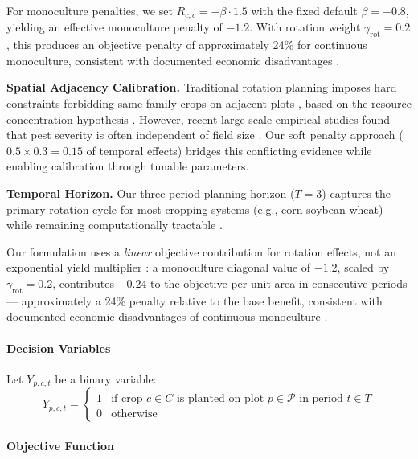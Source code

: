 \documentclass{oqireport}
\begin{document}
For monoculture penalties, we set $R_{c,c} = -\beta \cdot 1.5$ with the fixed default $\beta = -0.8$, yielding an effective monoculture penalty of $-1.2$. With rotation weight $\gamma_{\text{rot}} = 0.2$, this produces an objective penalty of approximately 24\% for continuous monoculture, consistent with documented economic disadvantages \cite{preissel2015magnitude, reckling2018grain}.

\textbf{Spatial Adjacency Calibration.}
Traditional rotation planning imposes hard constraints forbidding same-family crops on adjacent plots \cite{ballot2023first}, based on the resource concentration hypothesis \cite{root1973organization}. However, recent large-scale empirical studies found that pest severity is often independent of field size \cite{karp2018crop}. Our soft penalty approach ($0.5 \times 0.3 = 0.15$ of temporal effects) bridges this conflicting evidence while enabling calibration through tunable parameters.

\textbf{Temporal Horizon.}
Our three-period planning horizon ($T = 3$) captures the primary rotation cycle for most cropping systems (e.g., corn-soybean-wheat) while remaining computationally tractable \cite{haneveld2005crop}.

Our formulation uses a \emph{linear} objective contribution for rotation effects, not an exponential yield multiplier \cite{cai2011dynamic}: a monoculture diagonal value of $-1.2$, scaled by $\gamma_{\text{rot}}=0.2$, contributes $-0.24$ to the objective per unit area in consecutive periods — approximately a 24\% penalty relative to the base benefit, consistent with documented economic disadvantages of continuous monoculture \cite{preissel2015magnitude, kirkegaard2014magnitude}.


\paragraph{Decision Variables}
Let $Y_{p,c,t}$ be a binary variable:
\[
    Y_{p,c,t} = \begin{cases} 
    1 & \text{if crop } c \in C \text{ is planted on plot } p \in \mathcal{P} \text{ in period } t \in T \\
    0 & \text{otherwise}
    \end{cases}
\]

\paragraph{Objective Function}
\end{document}
